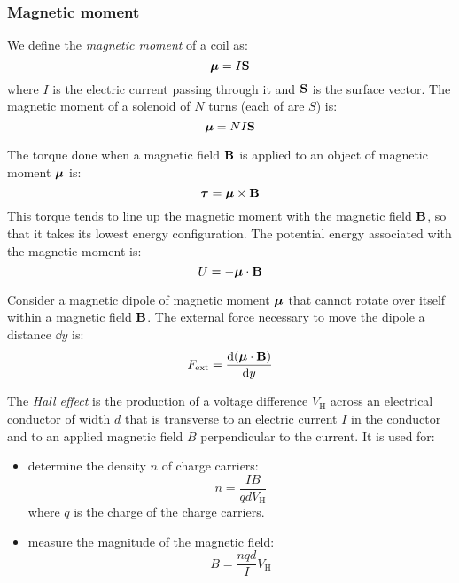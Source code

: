 \documentclass[../../../main.tex]{subfiles}
\begin{document}
\begin{multicols}{2}
    \subsubsection*{Magnetic moment}
    \begin{definition}
        We define the \textit{magnetic moment} of a coil as: $$\vb*{\mu}=I\boldsymbol{\mathrm{S}}$$ where $I$ is the electric current passing through it and $\boldsymbol{\mathrm{S}}$ is the surface vector. The magnetic moment of a solenoid of $N$ turns (each of are $S$) is: $$\vb*{\mu}=NI\boldsymbol{\mathrm{S}}$$
    \end{definition}
    \begin{prop}
        The torque done when a magnetic field $\boldsymbol{\mathrm{B}}$ is applied to an object of magnetic moment $\vb*{\mu}$ is: $$\vb*{\tau}=\vb*{\mu}\times\boldsymbol{\mathrm{B}}$$ This torque tends to line up the magnetic moment with the magnetic field $\boldsymbol{\mathrm{B}}$, so that it takes its lowest energy configuration. The potential energy associated with the magnetic moment is: $$U=-\vb*{\mu}\cdot\boldsymbol{\mathrm{B}}$$
    \end{prop}
    \begin{prop}
        Consider a magnetic dipole of magnetic moment $\vb*{\mu}$ that cannot rotate over itself within a magnetic field $\boldsymbol{\mathrm{B}}$. The external force necessary to move the dipole a distance $\dd y$ is: $$F_\text{ext}=\dv{(\vb*{\mu}\cdot\boldsymbol{\mathrm{B}})}{y}$$
    \end{prop}
    \begin{prop}
        The \textit{Hall effect} is the production of a voltage difference $V_\text{H}$ across an electrical conductor of width $d$ that is transverse to an electric current $I$ in the conductor and to an applied magnetic field $B$ perpendicular to the current.
        It is used for:
        \begin{itemize}
            \item determine the density $n$ of charge carriers: $$n=\frac{IB}{qdV_\text{H}}$$ where $q$ is the charge of the charge carriers.
            \item measure the magnitude of the magnetic field: $$B=\frac{nqd}{I}V_\text{H}$$
        \end{itemize}
    \end{prop}
    \begin{center}
        \begin{minipage}{\linewidth}
            \centering
            
        \end{minipage}
    \end{center}

\end{multicols}
\end{document}
